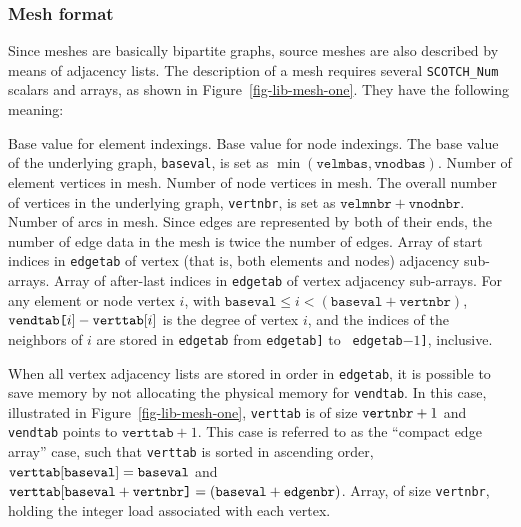 \subsubsection{Mesh format}
\label{sec-lib-format-mesh}

Since meshes are basically bipartite graphs, source meshes are also
described by means of adjacency lists. The description of a mesh
requires several {\tt SCOTCH\_Num} scalars and arrays, as shown in
Figure~\ref{fig-lib-mesh-one}. They have the following meaning:
\begin{itemize}
\iteme[{\tt velmbas}]
Base value for element indexings.
\iteme[{\tt vnodbas}]
Base value for node indexings. The base value of the underlying graph,
{\tt baseval}, is set as $\min(\mathtt{velmbas}, \mathtt{vnodbas})$.
\iteme[{\tt velmnbr}]
Number of element vertices in mesh.
\iteme[{\tt vnodnbr}]
Number of node vertices in mesh.
The overall number of vertices in the underlying graph, {\tt vertnbr},
is set as $\mathtt{velmnbr} +\mathtt{vnodnbr}$.
\iteme[{\tt edgenbr}]
Number of arcs in mesh. Since edges are represented by both of their
ends, the number of edge data in the mesh is twice the number of
edges.
\iteme[{\tt verttab}]
Array of start indices in {\tt edgetab} of vertex (that is, both
elements and nodes) adjacency sub-arrays.
\iteme[{\tt vendtab}]
Array of after-last indices in {\tt edgetab} of vertex adjacency
sub-arrays. For any element or node vertex $i$, with
$\mathtt{baseval} \leq i <
(\mathtt{baseval} + \mathtt{vertnbr})$, $\mbox{\tt
vendtab[}i\mathtt{]} - \mathtt{verttab[}i\mathtt{]}$ is the
degree of vertex $i$, and the indices of the neighbors of $i$ are
stored in {\tt edgetab} from {\tt edgetab\lbt [verttab[$i$]]} to {\tt
edgetab\lbt [vendtab[$i$]\lbt $- 1$]}, inclusive.

When all vertex adjacency lists are stored in order in {\tt edgetab},
it is possible to save memory by not allocating the physical memory
for {\tt vendtab}. In this case, illustrated in
Figure~\ref{fig-lib-mesh-one}, {\tt verttab} is of size $\mbox{\tt
vertnbr} + 1$ and {\tt vendtab} points to $\mathtt{verttab} + 1$.
This case is referred to as the ``compact edge array'' case, such that
{\tt verttab} is sorted in ascending order,
$\mathtt{verttab[}\lbt\mathtt{baseval]} = \mathtt{baseval}$
and $\mathtt{verttab[}\lbt\mathtt{baseval} + \mbox{\tt
vertnbr]} = (\mathtt{baseval} + \mathtt{edgenbr})$.
\iteme[{\tt velotab}]
Array, of size {\tt vertnbr}, holding the integer load associated with
each vertex.
\end{itemize}

